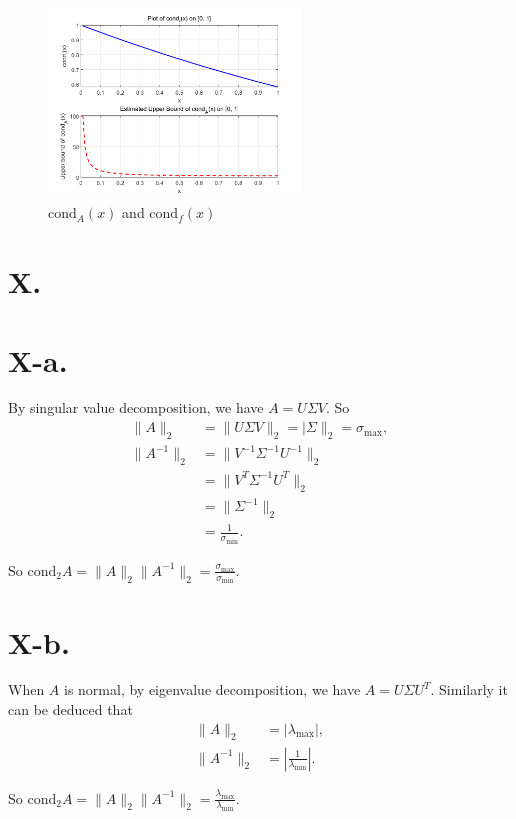 \documentclass[a4paper]{article}
\begin{document}
\begin{figure}[H]
  \centering
  \includegraphics[width=0.6\textwidth]{./figure/IX-c.png}
  \renewcommand{\figurename}{Fig.}
  \caption{$\mathrm{cond}_A(x)$ and $\mathrm{cond}_f(x)$}
  \label{fig1}
\end{figure}

\section*{X.}
\section*{X-a.}
By singular value decomposition, we have $A=U\Sigma V$. So 
$$
\begin{aligned}
  \|A\|_2&=\|U\Sigma V\|_2=|\Sigma \|_2=\sigma_{\max}, \\
  \|A^{-1}\|_2&=\|V^{-1}\Sigma^{-1} U^{-1}\|_2\\
  &=\|V^{T}\Sigma^{-1} U^{T}\|_2\\
  &=\|\Sigma^{-1}\|_2\\
  &=\frac{1}{\sigma_{\min}}.
\end{aligned}
$$

So $\mathrm{cond}_2 A=\|A\|_2 \|A^{-1}\|_2=\frac{\sigma_{\max}}{\sigma_{\min}}.$

\section*{X-b.}
When $A$ is normal, by eigenvalue decomposition, we have $A=U\Sigma U^{T}$. Similarly it can be deduced that 
$$\begin{aligned}
  \|A\|_2&=|\lambda_{\max}|, \\
  \|A^{-1}\|_2&=|\frac{1}{\lambda_{\min}}|.
\end{aligned}$$

So $\mathrm{cond}_2 A=\|A\|_2 \|A^{-1}\|_2=\frac{\lambda_{\max}}{\lambda_{\min}}.$
\end{document}
